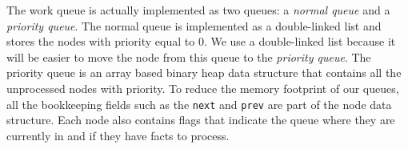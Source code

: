 The work queue is actually implemented as two queues: a \emph{normal queue} and a \emph{priority queue}.
The normal queue is implemented as a double-linked list and stores the nodes with priority equal to 0.
We use a double-linked list because it will be easier to move the node from this queue to the
\emph{priority queue}. The priority queue is an array based binary heap data structure that contains
all the unprocessed nodes with priority. To reduce the memory footprint of our queues, all the bookkeeping fields
such as the \texttt{next} and \texttt{prev} are part of the node data structure.
Each node also contains flags that indicate the queue where they are currently in and if they have facts to process.

\normalsize

